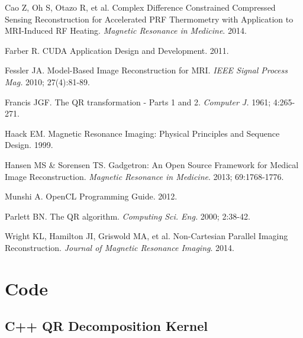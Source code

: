 \documentclass{article}
\begin{document}
\begin{thebibliography}{9}

	Cao Z, Oh S, Otazo R, et al.
	Complex Difference Constrained Compressed Sensing Reconstruction for Accelerated PRF Thermometry with Application to MRI-Induced RF Heating.
	\emph{Magnetic Resonance in Medicine}.
	2014.

	Farber R.
	CUDA Application Design and Development.
	2011.

	Fessler JA.
	Model-Based Image Reconstruction for MRI.
	\emph{IEEE Signal Process Mag.}
	2010;
	27(4):81-89.

	Francis JGF.
	The QR transformation - Parts 1 and 2.
	\emph{Computer J.}
	1961;
	4:265-271.

	Haack EM.
	Magnetic Resonance Imaging: Physical Principles and Sequence Design.
	1999.

	Hansen MS \& Sorensen TS.
	Gadgetron: An Open Source Framework for Medical Image Reconstruction.
	\emph{Magnetic Resonance in Medicine}.
	2013;
	69:1768-1776.

	Munshi A.
	OpenCL Programming Guide.
	2012.

	Parlett BN.
	The QR algorithm.
	\emph{Computing Sci. Eng.}
	2000;
	2:38-42.

	Wright KL, Hamilton JI, Griswold MA, et al.
	Non-Cartesian Parallel Imaging Reconstruction.
	\emph{Journal of Magnetic Resonance Imaging}.
	2014.

\end{thebibliography}

\appendix
\section{Code}

\subsection{C++ QR Decomposition Kernel}
\end{document}
